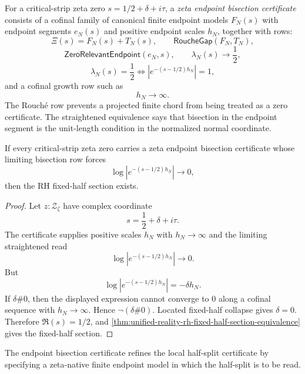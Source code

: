 \begin{definition}
\label{def:unified-reality-zeta-endpoint-bisection-certificate}
For a critical-strip zeta zero $s=1/2+\delta+i\tau$, a
\emph{zeta endpoint bisection certificate} consists of a cofinal family
of canonical finite endpoint models $F_N(s)$ with endpoint segments
$e_N(s)$ and positive endpoint scales $h_N$, together with rows:
$$
\Xi(s)=F_N(s)+T_N(s),
\qquad
\mathsf{RoucheGap}(F_N,T_N),
$$
$$
\mathsf{ZeroRelevantEndpoint}(e_N,s),
\qquad
\lambda_N(s)\to\frac12,
$$
$$
\lambda_N(s)=\frac12
\Longleftrightarrow
|e^{-(s-1/2)h_N}|=1,
$$
and a cofinal growth row such as
$$
h_N\to\infty.
$$
The Rouch\'e row prevents a projected finite chord from being treated as
a zero certificate.  The straightened equivalence says that bisection in
the endpoint segment is the unit-length condition in the normalized
normal coordinate.
\end{definition}

\begin{theorem}
\label{thm:unified-reality-endpoint-bisection-certificates-conditionally-sufficient}
If every critical-strip zeta zero carries a zeta endpoint bisection
certificate whose limiting bisection row forces
$$
\log|e^{-(s-1/2)h_N}|\to0,
$$
then the RH fixed-half section exists.
\end{theorem}

\begin{proof}
Let $z:\mathcal Z_{\zeta}$ have complex coordinate
$$
s=\frac12+\delta+i\tau.
$$
The certificate supplies positive scales $h_N$ with $h_N\to\infty$ and
the limiting straightened read
$$
\log|e^{-(s-1/2)h_N}|\to0.
$$
But
$$
\log|e^{-(s-1/2)h_N}|=-\delta h_N.
$$
If $\delta\#0$, then the displayed expression cannot converge to $0$
along a cofinal sequence with $h_N\to\infty$.  Hence
$\neg(\delta\#0)$.  Located fixed-half collapse gives $\delta=0$.
Therefore $\Re(s)=1/2$, and
\autoref{thm:unified-reality-rh-fixed-half-section-equivalence} gives
the fixed-half section.
\end{proof}

\begin{corollary}
\label{cor:unified-reality-endpoint-bisection-refines-local-half-split}
The endpoint bisection certificate refines the local half-split
certificate by specifying a zeta-native finite endpoint model in which
the half-split is to be read.
\end{corollary}

